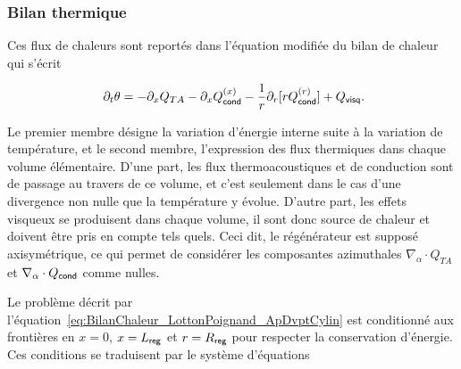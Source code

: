 \subsubsection{Bilan thermique}

Ces flux de chaleurs sont reportés dans l'équation modifiée du bilan de chaleur qui s'écrit


\begin{equation}
[\Phi\rho_0 C_p + (1-\Phi)\rho_s C_s]\ \partial_t \theta = - \partial_x Q_{TA} - \partial_x Q_{\sf cond}^{(x)} - \frac{1}{r}\partial_r[r Q_{\sf cond}^{(r)}] + Q_{\sf visq}.
\label{eq:BilanChaleur_LottonPoignand_ApDvptCylin}
\end{equation}

Le premier membre désigne la variation d'énergie interne suite à la variation de température, et le second membre, l'expression des flux thermiques dans chaque volume élémentaire. D'une part, les flux thermoacoustiques et de conduction sont \og de passage \fg{} au travers de ce volume, et c'est seulement dans le cas d'une divergence non nulle que la température y évolue. D'autre part, les effets visqueux se produisent dans chaque volume, il sont donc source de chaleur et doivent être pris en compte tels quels. Ceci dit, le régénérateur est supposé axisymétrique, ce qui permet de considérer les composantes azimuthales $\nabla_\alpha \cdot Q_{TA}$ et $\nabla_\alpha \cdot Q_{\sf cond}$ comme nulles.

Le problème décrit par l'équation~\ref{eq:BilanChaleur_LottonPoignand_ApDvptCylin} est conditionné aux frontières en $x=0$, $x=L_{\sf reg}$ et $r=R_{\sf reg}$ pour respecter la conservation d'énergie. Ces conditions se traduisent par le système d'équations

